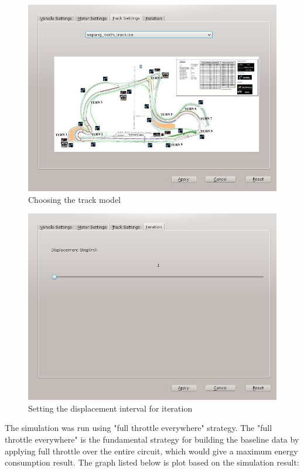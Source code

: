 \begin{figure}[htb]
	\centering
	\includegraphics[width=5in]{images/track_settings.jpg}
	\caption{Choosing the track model}
	\label{im:trackSettings}
\end{figure}

\begin{figure}[htb]
	\centering
	\includegraphics[width=5in]{images/iteration_step.jpg}
	\caption{Setting the displacement interval for iteration}
	\label{im:iterationStep}
\end{figure}

The simulation was run using "full throttle everywhere" strategy. The "full throttle everywhere" is the fundamental strategy for building the baseline data by applying full throttle over the entire circuit, which would give a maximum energy consumption result. The graph listed below is plot based on the simulation result:

